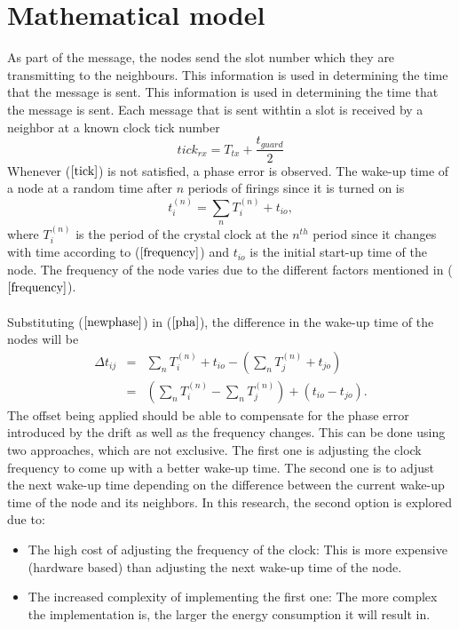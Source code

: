 \documentclass[a4paper,10pt]{report}
\begin{document}
\section{\textbf{Mathematical model}}
As part of the message, the nodes send the slot number which they are transmitting to the neighbours. This information is used in determining the time that the message is sent. This information is used in determining the time that the message is sent. Each message that is sent withtin a slot is received by a neighbor at a known clock tick number 
\begin{equation}
tick_{rx} = T_{tx}+ \frac{t_{guard}}{2} \label{tick}
\end{equation}
Whenever ($\ref{tick}$) is not satisfied, a phase error is observed. The wake-up time of a node at a random time after $n$ periods of firings since it is turned on is
\begin{equation}
t_i^{(n)} = \sum_{n} T_i^{(n)} + t_{io},\label{newphase}
\end{equation}
where  $T_i^{(n)}$ is the period of the crystal clock at the $n^{th}$ period since it changes with time according to
($\ref{frequency}$) and $t_{io}$ is the initial start-up time of the node. The frequency of the node varies due to the different factors mentioned in ($\ref{frequency}$). \paragraph*{}
Substituting ($\ref{newphase}$) in ($\ref{pha}$), the difference in the wake-up time of the nodes will be 
\begin{eqnarray}
\Delta t_{ij} & = & \sum_{n}T_i^{(n)} + t_{io}- (\sum_{n}T_j^{(n)} +
t_{jo}) \\ &=& (\sum_{n}T_i^{(n)} - \sum_{n}T_j^{(n)}) +
(t_{io}-t_{jo}).
\end{eqnarray}
The offset being applied should be able to compensate for the phase error introduced by the drift as well as the frequency changes. This
can be done using two approaches, which are not exclusive. The first one is adjusting the clock frequency to come up with a better
wake-up time. The second one is to adjust the next wake-up time depending on the difference between the current wake-up time of the
node and its neighbors. In this research, the second option is explored due to:
\begin{itemize}
\item The high cost of adjusting the frequency of the clock: This is more expensive (hardware based) than adjusting the next wake-up time of the node.
\item The increased complexity of implementing the first one: The more complex the implementation is, the larger the energy consumption it will result in.
\end{itemize}
\end{document}
